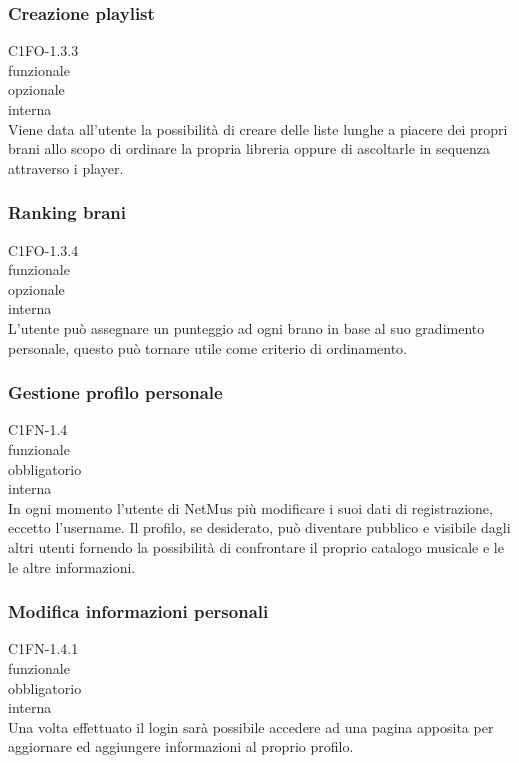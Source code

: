 \subsubsection*{Creazione playlist}
 C1FO-1.3.3 \\
 funzionale \\
 opzionale \\
 interna \\
Viene data all'utente la possibilit\`a di creare delle liste lunghe a piacere dei
propri brani allo scopo di ordinare la propria libreria oppure di ascoltarle in
sequenza attraverso i player.

\subsubsection*{Ranking brani}
 C1FO-1.3.4 \\
 funzionale \\
 opzionale \\
 interna \\
L'utente pu\`o assegnare un punteggio ad ogni brano in base al suo gradimento
personale, questo pu\`o tornare utile come criterio di ordinamento.

\subsubsection*{Gestione profilo personale}
 C1FN-1.4 \\
 funzionale \\
 obbligatorio \\
 interna \\
In ogni momento l'utente di NetMus pi\`u modificare i suoi dati di registrazione,
eccetto l'username. Il profilo, se desiderato, pu\`o diventare pubblico e visibile
dagli altri utenti fornendo la possibilit\`a di confrontare il proprio catalogo
musicale e le le altre informazioni.

\subsubsection*{Modifica informazioni personali}
 C1FN-1.4.1 \\
 funzionale \\
 obbligatorio \\
 interna \\
Una volta effettuato il login sar\`a possibile accedere ad una pagina apposita per
aggiornare ed aggiungere informazioni al proprio profilo.

